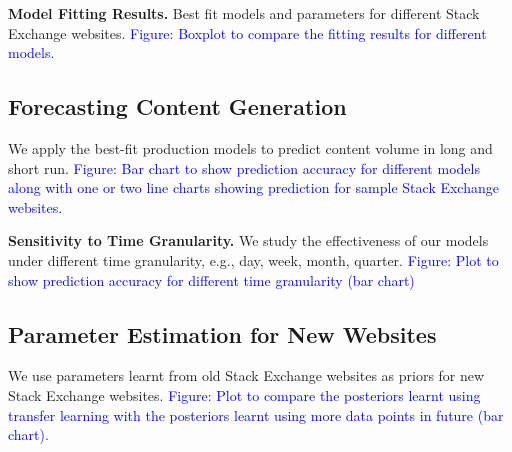 \textbf{Model Fitting Results.} 
Best fit models and parameters for different Stack Exchange websites. \textcolor{blue}{Figure: Boxplot to compare the fitting results for different models.}


\subsection{Forecasting Content Generation} 
We apply the best-fit production models to predict content volume in long and short run. \textcolor{blue}{Figure: Bar chart to show prediction accuracy for different models along with one or two line charts showing prediction for sample Stack Exchange websites.}

\textbf{Sensitivity to Time Granularity.} 
We study the effectiveness of our models under different time granularity, e.g., day, week, month, quarter. \textcolor{blue}{Figure: Plot to show prediction accuracy for different time granularity (bar chart)}

\subsection{Parameter Estimation for New Websites} We use parameters learnt from old Stack Exchange websites as priors for new Stack Exchange websites. \textcolor{blue}{Figure: Plot to compare the posteriors learnt using transfer learning with the posteriors learnt using more data points in future (bar chart).}




